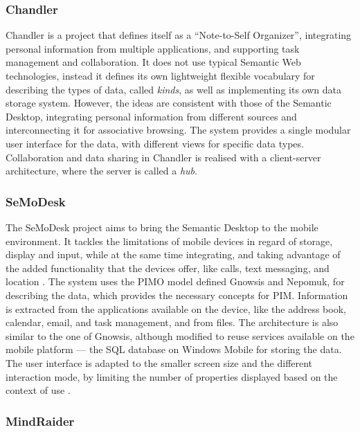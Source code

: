 \subsubsection{Chandler}

Chandler \cite{ChandlerProject} is a project that defines itself as a ``Note-to-Self Organizer'', integrating personal information from multiple applications, and supporting task management and collaboration. It does not use typical Semantic Web technologies, instead it defines its own lightweight flexible vocabulary for describing the types of data, called \emph{kinds}, as well as implementing its own data storage system. However, the ideas are consistent with those of the Semantic Desktop, integrating personal information from different sources and interconnecting it for associative browsing. The system provides a single modular user interface for the data, with different views for specific data types. Collaboration and data sharing in Chandler is realised with a client-server architecture, where the server is called a \emph{hub}.

\subsubsection{SeMoDesk}

The SeMoDesk \cite{Woerndl2008} project aims to bring the Semantic Desktop to the mobile environment. It tackles the limitations of mobile devices in regard of storage, display and input, while at the same time integrating, and taking advantage of the added functionality that the devices offer, like calls, text messaging, and location \cite{Woerndl2009b}. The system uses the PIMO model defined Gnowsis and Nepomuk, for describing the data, which provides the necessary concepts for PIM. Information is extracted from the applications available on the device, like the address book, calendar, email, and task management, and from files. The architecture is also similar to the one of Gnowsis, although modified to reuse services available on the mobile platform --- the SQL database on Windows Mobile for storing the data. The user interface is adapted to the smaller screen size and the different interaction mode, by limiting the number of properties displayed based on the context of use \cite{Woerndl2009a}.

\subsubsection{MindRaider}

